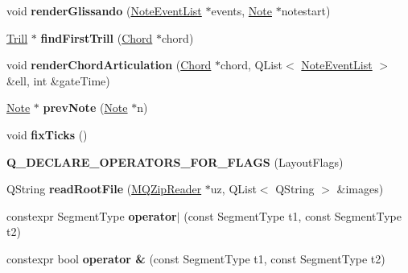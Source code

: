 \begin{DoxyCompactItemize}
void {\bfseries render\+Glissando} (\hyperlink{class_ms_1_1_note_event_list}{Note\+Event\+List} $\ast$events, \hyperlink{class_ms_1_1_note}{Note} $\ast$notestart)
\item 
\mbox{\label{namespace_ms_acabc4f5980acc74540fd0a7010555dcc}} 
\hyperlink{class_ms_1_1_trill}{Trill} $\ast$ {\bfseries find\+First\+Trill} (\hyperlink{class_ms_1_1_chord}{Chord} $\ast$chord)
\item 
\mbox{\label{namespace_ms_a094b89f0584ef6777eda583966fda9c3}} 
void {\bfseries render\+Chord\+Articulation} (\hyperlink{class_ms_1_1_chord}{Chord} $\ast$chord, Q\+List$<$ \hyperlink{class_ms_1_1_note_event_list}{Note\+Event\+List} $>$ \&ell, int \&gate\+Time)
\item 
\mbox{\label{namespace_ms_a742ba569a9d442eadb829a2376f00165}} 
\hyperlink{class_ms_1_1_note}{Note} $\ast$ {\bfseries prev\+Note} (\hyperlink{class_ms_1_1_note}{Note} $\ast$n)
\item 
\mbox{\label{namespace_ms_a6e842beb2374e2eaf442ab3ff476bbd3}} 
void {\bfseries fix\+Ticks} ()
\item 
\mbox{\label{namespace_ms_a99f39b9648695fcd9f294cf1f7f7d1d2}} 
{\bfseries Q\+\_\+\+D\+E\+C\+L\+A\+R\+E\+\_\+\+O\+P\+E\+R\+A\+T\+O\+R\+S\+\_\+\+F\+O\+R\+\_\+\+F\+L\+A\+GS} (Layout\+Flags)
\item 
\mbox{\label{namespace_ms_a5107b9100b4fb0cd9de4e93230a5198a}} 
Q\+String {\bfseries read\+Root\+File} (\hyperlink{class_m_q_zip_reader}{M\+Q\+Zip\+Reader} $\ast$uz, Q\+List$<$ Q\+String $>$ \&images)
\item 
\mbox{\label{namespace_ms_a5b007971a3bcba64c36bb0afddff940e}} 
constexpr Segment\+Type {\bfseries operator$\vert$} (const Segment\+Type t1, const Segment\+Type t2)
\item 
\mbox{\label{namespace_ms_ad5dbc67c40e0f4b33209a19d8de2c830}} 
constexpr bool {\bfseries operator \&} (const Segment\+Type t1, const Segment\+Type t2)
\item 
\mbox{\label{namespace_ms_a1078a3c89fb6a56c31bdac46f1524c2a}} 

\end{DoxyCompactItemize}
